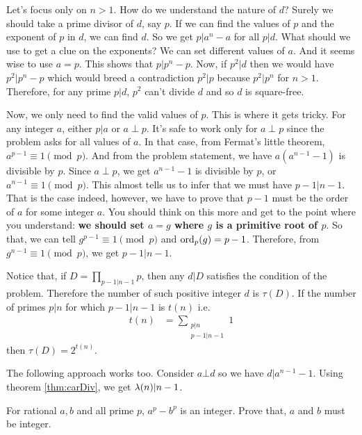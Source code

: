 \documentclass[problems.tex]{subfile}
\begin{document}
	\begin{solution}
		Let's focus only on $n>1$. How do we understand the nature of $d$? Surely we should take a prime divisor of $d$, say $p$. If we can find the values of $p$ and the exponent of $p$ in $d$, we can find $d$. So we get $p|a^n-a$ for all $p|d$. What should we use to get a clue on the exponents? We can set different values of $a$. And it seems wise to use $a=p$. This shows that $p|p^n-p$. Now, if $p^2|d$ then we would have $p^2|p^n-p$ which would breed a contradiction $p^2|p$ because $p^2|p^n$ for $n>1$. Therefore, for any prime $p|d$, $p^2$ can't divide $d$ and so $d$ is square-free.
		
		Now, we only need to find the valid values of $p$. This is where it gets tricky. For any integer $a$, either $p|a$ or $a\perp p$. It's safe to work only for $a\perp p$ since the problem asks for all values of $a$. In that case, from Fermat's little theorem, $a^{p-1}\equiv1\pmod p$. And from the problem statement, we have $a(a^{n-1}-1)$ is divisible by $p$. Since $a\perp p$, we get $a^{n-1}-1$ is divisible by $p$, or $a^{n-1}\equiv1\pmod p$. This almost tells us to infer that we must have $p-1|n-1$. That is the case indeed, however, we have to prove that $p-1$ must be the order of $a$ for some integer $a$. You should think on this more and get to the point where you understand: \textbf{we should set $a=g$ where $g$ is a primitive root of $p$}. So that, we can tell $g^{p-1}\equiv1\pmod p$ and $\operatorname{ord}_p(g)=p-1$. Therefore, from $g^{n-1}\equiv1\pmod p$, we get $p-1|n-1$.
		
		Notice that, if $D=\prod\limits_{p-1|n-1}p$, then any $d|D$ satisfies the condition of the problem. Therefore the number of such positive integer $d$ is $\tau(D)$. If the number of primes $p|n$ for which $p-1|n-1$ is $t(n)$ i.e.
			\begin{align*}
				t(n) & = \sum\limits_{\substack{p|n\\p-1|n-1}}1
			\end{align*}
		then $\tau(D) = 2^{t(n)}$.
	\end{solution}
	
	\begin{note}
		The following approach works too. Consider $a\bot d$ so we have $d|a^{n-1}-1$. Using theorem \eqref{thm:carDiv}, we get $\lambda(n)|n-1$.
	\end{note}
	
	\begin{problem}
		For rational $a,b$ and all prime $p$, $a^p-b^p$ is an integer. Prove that, $a$ and $b$ must be integer.
	\end{problem}
	
\end{document}

